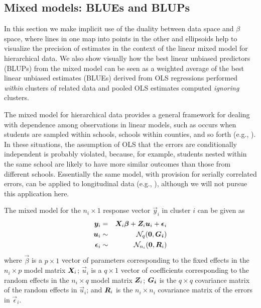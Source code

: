 \subsection{Mixed models: BLUEs and BLUPs}

In this section we make implicit use of the duality between data space and $\beta$
space, where lines in one map into points in the other and ellipsoids help to
visualize the precision of estimates in the context of the linear mixed
model for hierarchical data.  We also show visually how the best linear unbiased
predictors (BLUPs) from the mixed model can be seen as a weighted average
of the best linear unbiased estimates (BLUEs) derived from OLS regressions performed \emph{within} clusters of related data
and pooled OLS estimates computed \emph{ignoring} clusters.

The mixed model for hierarchical data provides a general framework for
dealing with dependence among observations in linear models,
such as occurs when students are sampled within schools, schools within
counties, and so forth
(e.g., \citealp{RaudenbushBryk:2002}). 
In these situations, the assumption of OLS that
the errors are conditionally independent is probably violated,
because, for example, students nested within the same school are
likely to have more similar outcomes than those from different schools. Essentially the same model, with provision for serially correlated errors, can be applied to longitudinal data (e.g., \citealp{LairdWare:1982}), although we will not pursue this application here.


The mixed model for the $n_i \times 1$ response vector $\vec{y}_i$ in
cluster $i$ can be given as
\begin{eqnarray}
 \bm{y}_i & = & \bm{X}_i \bm{\beta} + \bm{Z}_i \bm{u}_i + \bm{\epsilon}_i \label{eq:mixed1} \\
 \bm{u}_i & \sim & \mathcal{N}_q (\bm{0}, \bm{G_i}) \nonumber\\
 \bm{\epsilon}_i & \sim & \mathcal{N}_{n_i} (\bm{0}, \bm{R}_i) \nonumber
\end{eqnarray}
where
$\vec{\beta}$ is a $p \times 1$ vector of parameters corresponding to the fixed effects
in the $n_i \times p$ model matrix $\bm{X}_i$;
$\vec{u}_i$ is a $q \times 1$ vector of coefficients corresponding to the random effects
in the $n_i \times q$ model matrix $\bm{Z}_i$;
$\bm{G_i}$ is the $q \times q$ covariance matrix of the random effects in $\vec{u}_i$;
and $\bm{R}_i$ is the $n_i \times n_i$ covariance matrix of the errors in $\vec{\epsilon}_i$.

